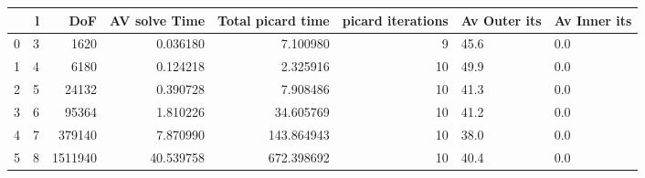 \begin{tabular}{lrrrrrll}
\toprule
{} &  l &      DoF &  AV solve Time &  Total picard time &  picard iterations & Av Outer its & Av Inner its \\
\midrule
0 &  3 &     1620 &       0.036180 &           7.100980 &                  9 &         45.6 &          0.0 \\
1 &  4 &     6180 &       0.124218 &           2.325916 &                 10 &         49.9 &          0.0 \\
2 &  5 &    24132 &       0.390728 &           7.908486 &                 10 &         41.3 &          0.0 \\
3 &  6 &    95364 &       1.810226 &          34.605769 &                 10 &         41.2 &          0.0 \\
4 &  7 &   379140 &       7.870990 &         143.864943 &                 10 &         38.0 &          0.0 \\
5 &  8 &  1511940 &      40.539758 &         672.398692 &                 10 &         40.4 &          0.0 \\
\bottomrule
\end{tabular}
